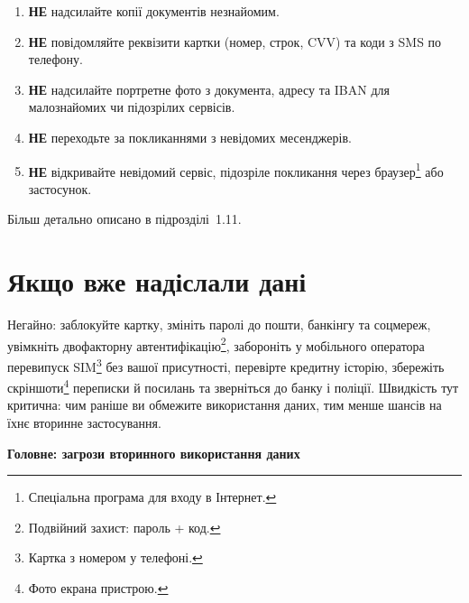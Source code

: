 \begin{enumerate}[label=\arabic*.]
    \item \textbf{НЕ} надсилайте копії документів незнайомим.
    \item \textbf{НЕ} повідомляйте реквізити картки (номер, строк, CVV) та коди з SMS по телефону.
    \item \textbf{НЕ} надсилайте портретне фото з документа, адресу та IBAN для малознайомих чи підозрілих сервісів.
    \item \textbf{НЕ} переходьте за покликаннями з невідомих месенджерів.
    \item \textbf{НЕ} відкривайте невідомий сервіс, підозріле покликання через браузер\footnote{Спеціальна програма для входу в Інтернет.} або застосунок.
\end{enumerate}

\noindent Більш детально описано в підрозділі~1.11.

\vspace{0.3cm}
\section{Якщо вже надіслали дані}

Негайно: заблокуйте картку, змініть паролі до пошти, банкінгу та соцмереж, увімкніть двофакторну автентифікацію\footnote{Подвійний захист: пароль + код.}, забороніть у мобільного оператора перевипуск SIM\footnote{Картка з номером у телефоні.} без вашої присутності, перевірте кредитну історію, збережіть скріншоти\footnote{Фото екрана пристрою.} переписки й посилань та зверніться до банку і поліції. Швидкість тут критична: чим раніше ви обмежите використання даних, тим менше шансів на їхнє вторинне застосування.

\vspace{0.3cm}

\newpage

\noindent\textbf{Головне: загрози вторинного використання даних}

